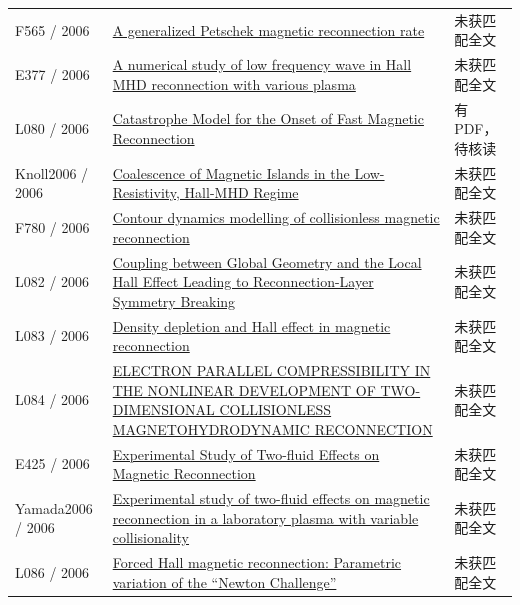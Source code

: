 \begin{longtable}{P{24mm}P{97mm}P{27mm}}
F565 / 2006 & \href{https://doi.org/10.1063/1.2375039}{A generalized Petschek magnetic reconnection rate} & 未获匹配全文\\

E377 / 2006 & \href{https://ui.adsabs.harvard.edu/abs/2006cosp...36.3552L/abstract}{A numerical study of low frequency wave in Hall MHD reconnection with various plasma} & 未获匹配全文\\

L080 / 2006 & \href{http://hdl.handle.net/1903/4139}{Catastrophe Model for the Onset of Fast Magnetic Reconnection} & 有PDF，待核读\\

Knoll2006 / 2006 & \href{https://doi.org/10.1103/physrevlett.96.135001}{Coalescence of Magnetic Islands in the Low-Resistivity,  Hall-MHD Regime} & 未获匹配全文\\

F780 / 2006 & \href{http://library.tue.nl/csp/dare/LinkToRepository.csp?recordnumber=686527}{Contour dynamics modelling of collisionless magnetic reconnection} & 未获匹配全文\\

L082 / 2006 & \href{https://doi.org/10.1103/physrevlett.97.135002}{Coupling between Global Geometry and the Local Hall Effect Leading to Reconnection-Layer Symmetry Breaking} & 未获匹配全文\\

L083 / 2006 & \href{https://doi.org/10.1029/2005ja011536}{Density depletion and Hall effect in magnetic reconnection} & 未获匹配全文\\

L084 / 2006 & \href{https://doi.org/10.1142/s0217984906011621}{ELECTRON PARALLEL COMPRESSIBILITY IN THE NONLINEAR DEVELOPMENT OF TWO-DIMENSIONAL COLLISIONLESS MAGNETOHYDRODYNAMIC RECONNECTION} & 未获匹配全文\\

E425 / 2006 & \href{http://absimage.aps.org/image/DPP06/MWS_DPP06-2006-000627.pdf}{Experimental Study of Two-fluid Effects on Magnetic Reconnection} & 未获匹配全文\\

Yamada2006 / 2006 & \href{https://doi.org/10.1063/1.2203950}{Experimental study of two-fluid effects on magnetic reconnection in a laboratory plasma with variable collisionality} & 未获匹配全文\\

L086 / 2006 & \href{https://doi.org/10.1063/1.2212397}{Forced Hall magnetic reconnection: Parametric variation of the “Newton Challenge”} & 未获匹配全文\\


\end{longtable}
